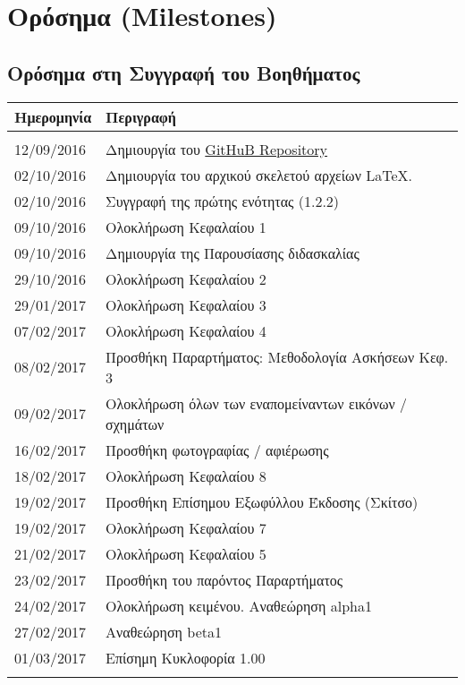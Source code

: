 \chapter{Ορόσημα (Milestones)}
\newpage
\section{Ορόσημα στη Συγγραφή του Βοηθήματος}

\begin{tabular}{ll}
\textbf{Ημερομηνία} & \textbf{Περιγραφή} \\
\hline\\
 12/09/2016 & Δημιουργία του \href{https://github.com/sonic2000gr/diktia}{GitHuB Repository}\\ 
 02/10/2016 & Δημιουργία του αρχικού σκελετού αρχείων \LaTeX.\\
 02/10/2016 & Συγγραφή της πρώτης ενότητας (1.2.2)\\
 09/10/2016 & Ολοκλήρωση Κεφαλαίου 1\\
 09/10/2016 & Δημιουργία της Παρουσίασης διδασκαλίας\\
 29/10/2016 & Ολοκλήρωση Κεφαλαίου 2\\
 29/01/2017 & Ολοκλήρωση Κεφαλαίου 3\\
 07/02/2017 & Ολοκλήρωση Κεφαλαίου 4\\
 08/02/2017 & Προσθήκη Παραρτήματος: Μεθοδολογία Ασκήσεων Κεφ. 3\\
 09/02/2017 & Ολοκλήρωση όλων των εναπομείναντων εικόνων / σχημάτων\\
 16/02/2017 & Προσθήκη φωτογραφίας / αφιέρωσης\\
 18/02/2017 & Ολοκλήρωση Κεφαλαίου 8\\
 19/02/2017 & Προσθήκη Επίσημου Εξωφύλλου Έκδοσης (Σκίτσο)\\
 19/02/2017 & Ολοκλήρωση Κεφαλαίου 7\\
 21/02/2017 & Ολοκλήρωση Κεφαλαίου 5\\
 23/02/2017 & Προσθήκη του παρόντος Παραρτήματος\\
 24/02/2017 & Ολοκλήρωση κειμένου. Αναθεώρηση alpha1\\
 27/02/2017 & Αναθεώρηση beta1\\
 01/03/2017 & Επίσημη Κυκλοφορία 1.00\\\\
\hline
\end{tabular}
